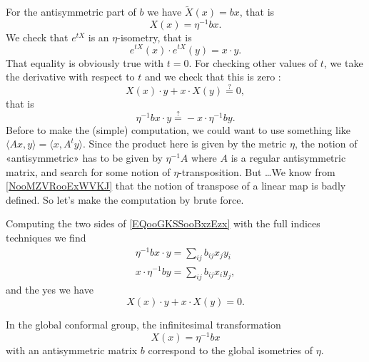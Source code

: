 \begin{description}
    For the antisymmetric part of \(b\)  we have \( \tilde X(x)=bx\), that is
    \begin{equation}
        X(x)=\eta^{-1}bx.
    \end{equation}
    We check that \(  e^{tX}\) is an \( \eta\)-isometry, that is
    \begin{equation}
        e^{tX}(x)\cdot  e^{tX}(y)=x\cdot y.
    \end{equation}
    That equality is obviously true with \( t=0\). For checking other values of \( t\), we take the derivative with respect to \( t\) and we check that this is zero :
    \begin{equation}
        X(x)\cdot y+x\cdot X(y)\stackrel{?}{=}0,
    \end{equation}
    that is
    \begin{equation}    \label{EQooGKSSooBxzEzx}
        \eta^{-1}bx\cdot y\stackrel{?}{=}-x\cdot \eta^{-1}by.
    \end{equation}
    Before to make the (simple) computation, we could want to use something like \( \langle Ax, y\rangle =\langle x, A^ty\rangle \). Since the product here is given by the metric \( \eta\), the notion of «antisymmetric» has to be given by \( \eta^{-1}A\) where \( A\) is a regular antisymmetric matrix, and search for some notion of \( \eta\)-transposition. But \ldots We know from \ref{NooMZVRooExWVKJ} that the notion of transpose of a linear map is badly defined. So let's make the computation by brute force.

    Computing the two sides of \eqref{EQooGKSSooBxzEzx} with the full indices techniques we find
    \begin{subequations}
        \begin{align}
            \eta^{-1}bx\cdot y=\sum_{ij}b_{ij}x_jy_i\\
            x\cdot \eta^{-1}by=\sum_{ij}b_{ij}x_iy_j,
        \end{align}
    \end{subequations}
    and the yes we have 
    \begin{equation}
        X(x)\cdot y+x\cdot X(y)=0.
    \end{equation}

    In the global conformal group, the infinitesimal transformation
    \begin{equation}
        X(x)=\eta^{-1}bx
    \end{equation}
    with an antisymmetric matrix \( b\) correspond to the global isometries of \( \eta\).


\end{description}
